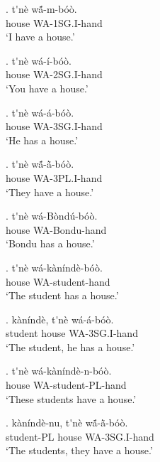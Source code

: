 \documentclass{assets/fieldnotes}
\begin{document}


\exg. t\'{}n\`{e} wã́-m-b\'{o}\`{o}. \\
house WA-1SG.I-hand \\
`I have a house.'

\exg. t\'{}n\`{e} w\'{a}-\'{i}-b\'{o}\`{o}. \\
house WA-2SG.I-hand \\
`You have a house.'

\exg. t\'{}n\`{e} w\'{a}-\'{a}-b\'{o}\`{o}. \\
house WA-3SG.I-hand \\
`He has a house.'

\exg. t\'{}n\`{e} wã́-ã̀-b\'{o}\`{o}. \\
house WA-3PL.I-hand \\
`They have a house.'

\exg. t\'{}n\`{e} w\'{a}-B\`{o}nd\'{u}-b\'{o}\`{o}. \\
house WA-Bondu-hand \\
`Bondu has a house.'

\exg. t\'{}n\`{e} w\'{a}-k\`{a}n\'{i}nd\`{e}-b\'{o}\`{o}. \\
house WA-student-hand \\
`The student has a house.'

\exg. k\`{a}n\'{i}nd\`{e}, t\'{}n\`{e} w\'{a}-\'{a}-b\'{o}\`{o}. \\
student house WA-3SG.I-hand \\
`The student, he has a house.' 

\exg. t\'{}n\`{e} w\'{a}-k\`{a}n\'{i}nd\`{e}-n-b\'{o}\`{o}. \\
house WA-student-PL-hand \\
`These students have a house.' 

\exg. k\`{a}n\'{i}nd\`{e}-nu, t\'{}n\`{e} wã́-ã̀-b\'{o}\`{o}. \\
student-PL house WA-3SG.I-hand \\
`The students, they have a house.' 
\end{document}
